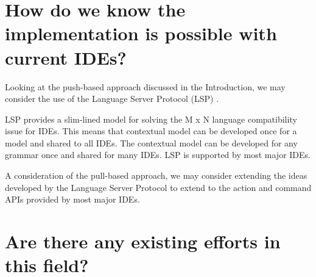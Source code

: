 \section{How do we know the implementation is possible with current IDEs?}

Looking at the push-based approach discussed in the Introduction, we may consider the use of the Language Server Protocol (LSP) \parencite{lspGitHubSiteMSFT}.

LSP provides a slim-lined model for solving the M x N language compatibility issue for IDEs. This means that contextual model can be developed once for a model and shared to all IDEs. The contextual model can be developed for any grammar once and shared for many IDEs. LSP is supported by most major IDEs.

A consideration of the pull-based approach, we may consider extending the ideas developed by the Language Server Protocol to extend to the action and command APIs provided by most major IDEs.



\section{Are there any existing efforts in this field?}
